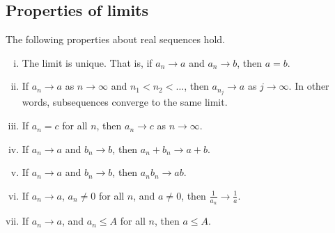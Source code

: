 \subsection{Properties of limits}
\begin{lemma}
	The following properties about real sequences hold.
	\begin{enumerate}[(i)]
		\item The limit is unique.
		      That is, if \(a_n \to a\) and \(a_n \to b\), then \(a = b\).
		\item If \(a_n \to a\) as \(n \to \infty\) and \(n_1 < n_2 < \dots\), then \(a_{n_j} \to a\) as \(j \to \infty\).
		      In other words, subsequences converge to the same limit.
		\item If \(a_n = c\) for all \(n\), then \(a_n \to c\) as \(n \to \infty\).
		\item If \(a_n \to a\) and \(b_n \to b\), then \(a_n + b_n \to a + b\).
		\item If \(a_n \to a\) and \(b_n \to b\), then \(a_n b_n \to ab\).
		\item If \(a_n \to a\), \(a_n \neq 0\) for all \(n\), and \(a \neq 0\), then \(\frac{1}{a_n} \to \frac{1}{a}\).
		\item If \(a_n \to a\), and \(a_n \leq A\) for all \(n\), then \(a \leq A\).
	\end{enumerate}
\end{lemma}
